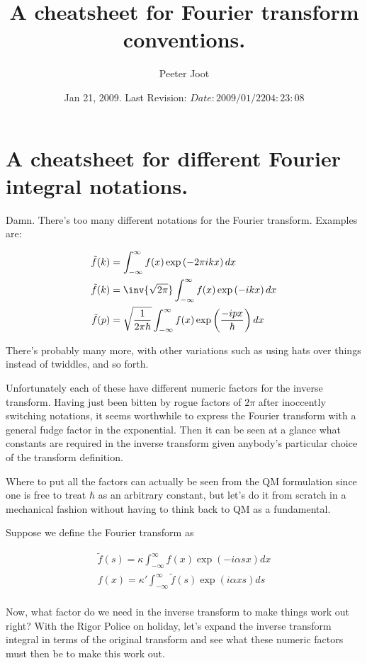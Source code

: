\documentclass{article}
\title{ A cheatsheet for Fourier transform conventions. }
\author{Peeter Joot}
\date{ Jan 21, 2009.  Last Revision: $Date: 2009/01/22 04:23:08 $ }
\newcommand{\IIinf}[0]{ \int_{-\infty}^\infty }
\begin{document}
\maketitle{}


\section{ A cheatsheet for different Fourier integral notations. }

Damn.  There's too many different notations for the Fourier transform.  Examples are:

\begin{align*}
\tilde{f}(k) &= \IIinf f(x) \exp\left( - 2 \pi i k x \right) dx \\
\tilde{f}(k) &= \inv{\sqrt{2\pi}} \IIinf f(x) \exp\left( -i k x \right) dx \\
\tilde{f}(p) &= \sqrt{\frac{1}{2\pi\hbar}} \IIinf f(x) \exp\left( \frac{-i p x}{\hbar} \right) dx \\
\end{align*}

There's probably many more, with other variations such as using hats over things instead of twiddles, and so forth.

Unfortunately each of these have different numeric factors for the inverse transform.
Having just been bitten by rogue factors of $2 \pi$ after inoccently switching notations, it seems
worthwhile
to express the Fourier transform with a general fudge factor in the exponential.  Then it can be
seen at a 
glance what constants are required in the inverse transform given anybody's particular choice of the transform
definition.

Where to put all the factors can actually be seen from the QM formulation since one is free to treat $\hbar$
as an arbitrary constant, but let's do it from scratch in a mechanical fashion without having to think
back to QM as a fundamental.

Suppose we define the Fourier transform as 

\begin{align*}
\tilde{f}(s) = \kappa \IIinf f(x) \exp\left( - i \alpha s x \right) dx \\
{f}(x) = \kappa' \IIinf \tilde{f}(s) \exp\left( i \alpha x s \right) ds \\
\end{align*}

Now, what factor do we need in the inverse transform to make things work out right?  With the Rigor
Police on holiday, let's expand the inverse transform integral in terms of the original transform
and see what these numeric factors must then be to make this work out.
\end{document}
